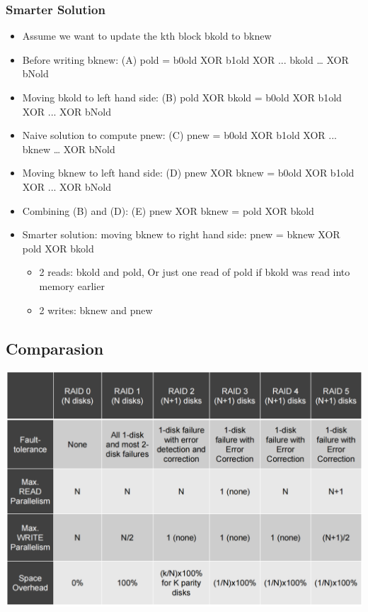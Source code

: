 \documentclass[12pt]{article}
\begin{document}
\subsubsection{Smarter Solution}
\begin{itemize}
    \item Assume we want to update the kth block bkold to bknew 
    \item Before writing bknew: (A) pold = b0old XOR b1old XOR ... bkold … XOR bNold 
    \item Moving bkold to left hand side: (B) pold XOR bkold = b0old XOR b1old XOR ... XOR bNold
    \item Naive solution to compute pnew: (C) pnew = b0old XOR b1old XOR ... bknew … XOR bNold 
    \item Moving bknew to left hand side: (D) pnew XOR bknew = b0old XOR b1old XOR ... XOR bNold 
    \item Combining (B) and (D): (E) pnew XOR bknew = pold XOR bkold
    \item Smarter solution: moving bknew to right hand side: pnew = bknew XOR pold XOR bkold \begin{itemize}
        \item 2 reads: bkold and pold, Or just one read of pold if bkold was read into memory earlier
        \item 2 writes: bknew and pnew
    \end{itemize}
\end{itemize}
\subsection{Comparasion}
\includegraphics[width=\textwidth]{RaidComparasion.png}
\end{document}
